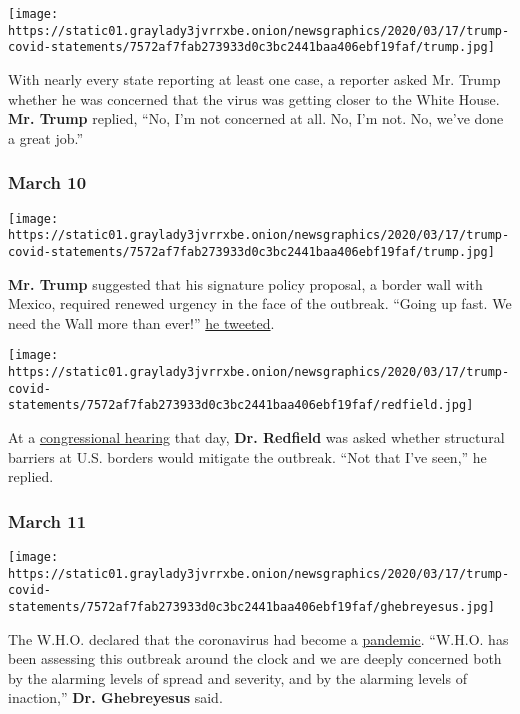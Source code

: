 \texttt{[image: https://static01.graylady3jvrrxbe.onion/newsgraphics/2020/03/17/trump-covid-statements/7572af7fab273933d0c3bc2441baa406ebf19faf/trump.jpg]}

With nearly every state reporting at least one case, a reporter asked
Mr. Trump whether he was concerned that the virus was getting closer to
the White House. \textbf{Mr. Trump} replied, ``No, I'm not concerned at
all. No, I'm not. No, we've done a great job.''

\hypertarget{march-10}{%
\subsubsection{March 10}\label{march-10}}

\texttt{[image: https://static01.graylady3jvrrxbe.onion/newsgraphics/2020/03/17/trump-covid-statements/7572af7fab273933d0c3bc2441baa406ebf19faf/trump.jpg]}

\textbf{Mr. Trump} suggested that his signature policy proposal, a
border wall with Mexico, required renewed urgency in the face of the
outbreak. ``Going up fast. We need the Wall more than ever!''
\href{https://twitter.com/realdonaldtrump/status/1237334397172490240?lang=en}{he
tweeted}.

\texttt{[image: https://static01.graylady3jvrrxbe.onion/newsgraphics/2020/03/17/trump-covid-statements/7572af7fab273933d0c3bc2441baa406ebf19faf/redfield.jpg]}

At a
\href{https://www.c-span.org/video/?470181-1/cdc-director-redfield-testifies-coronavirus\&live\&vod\&start=5721}{congressional
hearing} that day, \textbf{Dr. Redfield} was asked whether structural
barriers at U.S. borders would mitigate the outbreak. ``Not that I've
seen,'' he replied.

\hypertarget{march-11}{%
\subsubsection{March 11}\label{march-11}}

\texttt{[image: https://static01.graylady3jvrrxbe.onion/newsgraphics/2020/03/17/trump-covid-statements/7572af7fab273933d0c3bc2441baa406ebf19faf/ghebreyesus.jpg]}

The W.H.O. declared that the coronavirus had become a
\href{https://www.who.int/dg/speeches/detail/who-director-general-s-opening-remarks-at-the-media-briefing-on-covid-19---11-march-2020}{pandemic}.
``W.H.O. has been assessing this outbreak around the clock and we are
deeply concerned both by the alarming levels of spread and severity, and
by the alarming levels of inaction,'' \textbf{Dr. Ghebreyesus} said.

